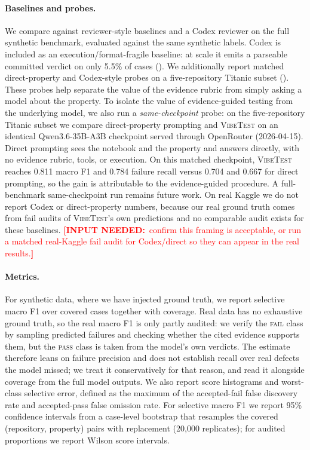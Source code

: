 \documentclass[11pt]{article}
\DeclareRobustCommand{\needsinput}[1]{\textcolor{red}{\textbf{[INPUT NEEDED:}~#1\textbf{]}}}
\newcommand{\pass}{\textsc{pass}}
\newcommand{\fail}{\textsc{fail}}
\newcommand{\vibetest}{\textsc{VibeTest}}
\begin{document}
\paragraph{Baselines and probes.}
We compare against reviewer-style baselines and a Codex reviewer on the full
synthetic benchmark, evaluated against the same synthetic labels.
Codex is included as an execution/format-fragile baseline: at scale it emits a
parseable committed verdict on only 5.5\% of cases ().
We additionally report matched direct-property and Codex-style probes on a
five-repository Titanic subset ().
These probes help separate the value of the evidence rubric from simply asking
a model about the property.
To isolate the value of evidence-guided testing from the underlying model, we
also run a \emph{same-checkpoint} probe: on the five-repository Titanic subset we
compare direct-property prompting and \vibetest{} on an identical
Qwen3.6-35B-A3B checkpoint served through OpenRouter (2026-04-15).
Direct prompting sees the notebook and the property and answers directly, with
no evidence rubric, tools, or execution.
On this matched checkpoint, \vibetest{} reaches 0.811 macro F1 and 0.784 failure
recall versus 0.704 and 0.667 for direct prompting, so the gain is attributable
to the evidence-guided procedure.
A full-benchmark same-checkpoint run remains future work.
On real Kaggle we do not report Codex or direct-property numbers, because our
real ground truth comes from fail audits of \vibetest{}'s own predictions and no
comparable audit exists for these baselines.
\needsinput{confirm this framing is acceptable, or run a matched real-Kaggle fail
audit for Codex/direct so they can appear in the real results.}

\paragraph{Metrics.}
For synthetic data, where we have injected ground truth, we report selective
macro F1 over covered cases together with coverage.
Real data has no exhaustive ground truth, so the real macro F1 is only partly
audited: we verify the \fail{} class by sampling predicted failures and checking
whether the cited evidence supports them, but the \pass{} class is taken from
the model's own verdicts.
The estimate therefore leans on failure precision and does not establish recall
over real defects the model missed; we treat it conservatively for that reason,
and read it alongside coverage from the full model outputs.
We also report score histograms and worst-class selective error, defined as the
maximum of the accepted-fail false discovery rate and accepted-pass false
omission rate.
For selective macro F1 we report 95\% confidence intervals from a case-level
bootstrap that resamples the covered (repository, property) pairs with
replacement (20{,}000 replicates); for audited proportions we report Wilson
score intervals.
\end{document}
